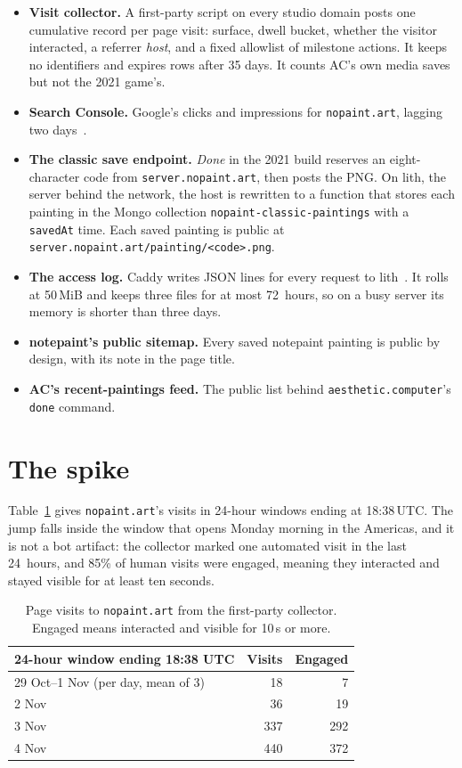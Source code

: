\documentclass[10pt,letterpaper,twocolumn]{article}
\begin{document}
\begin{itemize}
\item \textbf{Visit collector.} A first-party script on every studio
domain posts one cumulative record per page visit: surface, dwell
bucket, whether the visitor interacted, a referrer \emph{host}, and a
fixed allowlist of milestone actions. It keeps no identifiers and
expires rows after 35 days. It counts AC's own media saves but not the
2021 game's.
\item \textbf{Search Console.} Google's clicks and impressions for
\texttt{nopaint.art}, lagging two days~\citep{google2026performance}.
\item \textbf{The classic save endpoint.} \emph{Done} in the 2021 build
reserves an eight-character code from \texttt{server.nopaint.art}, then
posts the PNG. On lith, the server behind the network, the host is
rewritten to a function that stores each painting in the Mongo
collection \texttt{nopaint-classic-paintings} with a \texttt{savedAt}
time. Each saved painting is public at
\texttt{server.nopaint.art/painting/<code>.png}.
\item \textbf{The access log.} Caddy writes JSON lines for every request
to lith~\citep{caddy2026log}. It rolls at 50\,MiB and keeps three files
for at most 72~hours, so on a busy server its memory is shorter than
three days.
\item \textbf{notepaint's public sitemap.} Every saved notepaint
painting is public by design, with its note in the page title.
\item \textbf{AC's recent-paintings feed.} The public list behind
\texttt{aesthetic.computer}'s \texttt{done} command.
\end{itemize}

\section{The spike}
\label{sec:spike}

Table~\ref{tab:visits} gives \texttt{nopaint.art}'s visits in 24-hour
windows ending at 18:38\,UTC. The jump falls inside the window that
opens Monday morning in the Americas, and it is not a bot artifact:
the collector marked one automated visit in the last 24~hours, and 85\%
of human visits were engaged, meaning they interacted and stayed
visible for at least ten seconds.

\begin{table}[t]
\centering\small
\caption{Page visits to \texttt{nopaint.art} from the first-party
collector. Engaged means interacted and visible for 10\,s or more.}
\label{tab:visits}
\begin{tabular}{@{}lrr@{}}
\toprule
24-hour window ending 18:38 UTC & Visits & Engaged \\
\midrule
29 Oct--1 Nov (per day, mean of 3) & 18 & 7 \\
2 Nov & 36 & 19 \\
3 Nov & 337 & 292 \\
4 Nov & 440 & 372 \\
\bottomrule
\end{tabular}
\end{table}
\end{document}

